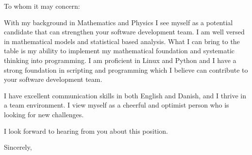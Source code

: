 \documentclass[10pt,a4paper]{letter}
\begin{document}
\begin{letter}{}
\opening{To whom it may concern:}

With my background in Mathematics and Physics I see myself as a potential candidate that can strengthen your software development team. I am well versed in mathematical models and statistical based analysis. What I can bring to the table is my ability to implement my mathematical foundation and systematic thinking into programming. I am proficient in Linux and Python and I have a strong foundation in scripting and programming which I believe can contribute to your software development team.
 
I have excellent communication skills in both English and Danish, and I thrive in a team environment. I view myself as a cheerful and optimist person who is looking for new challenges.

I look forward to hearing from you about this position.   

\closing{Sincerely,}

\end{letter}

\end{document}
